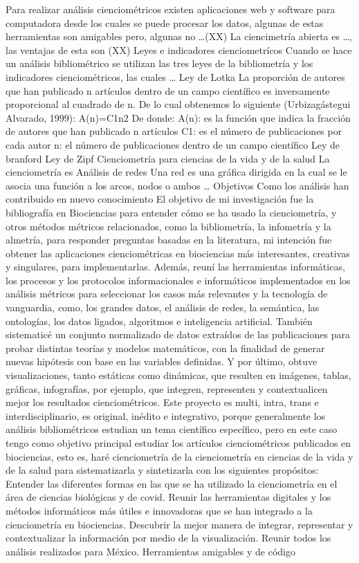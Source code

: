 \documentclass[../Main.tex]{subfiles}
\begin{document}
Para realizar análisis cienciométricos existen aplicaciones web y software para computadora desde los cuales se puede procesar los datos, algunas de estas herramientas son amigables pero, algunas no …(XX)
La ciencimetría abierta es …, las ventajas de esta son (XX)
Leyes e indicadores cienciometrícos 
Cuando se hace un análisis bibliométrico se utilizan las tres leyes de la bibliometría y los indicadores cienciométricos, las cuales … 
Ley de Lotka
La proporción de autores que han publicado n artículos dentro de un campo científico es inversamente proporcional al cuadrado de n. De lo cual obtenemos lo siguiente (Urbizagástegui Alvarado, 1999):
A(n)=C1n2
De donde:
A(n): es la función que indica la fracción de autores que han publicado n artículos
C1: es el número de publicaciones por cada autor 
n: el número de publicaciones dentro de un campo científico 
Ley de branford 
Ley de Zipf
Cienciometría para ciencias de la vida y de la salud
La cienciometría es 
Análisis de redes
Una red es una gráfica dirigida en la cual se le asocia una función a los arcos, nodos o ambos … 
Objetivos
Como los análisis han contribuido en nuevo conocimiento
El objetivo de mi investigación fue la bibliografía en Biociencias para entender cómo se ha usado la cienciometría, y otros métodos métricos relacionados, como la bibliometría, la infometría y la almetría, para responder preguntas basadas en la literatura, mi intención fue obtener las aplicaciones cienciométricas en biociencias más interesantes, creativas y singulares, para implementarlas. Además, reuní las herramientas informáticas, los procesos y los protocolos informacionales e informáticos implementados en los análisis métricos para seleccionar los casos más relevantes y la tecnología de vanguardia, como, los grandes datos, el análisis de redes, la semántica, las ontologías, los datos ligados, algoritmos e inteligencia artificial. También sistematicé un conjunto normalizado de datos extraídos de las publicaciones para probar distintas teorías y modelos matemáticos, con la finalidad de generar nuevas hipótesis con base en las variables definidas. Y por último, obtuve visualizaciones, tanto estáticas como dinámicas, que resulten en imágenes, tablas, gráficas, infografías, por ejemplo, que integren, representen y contextualicen mejor los resultados cienciométricos.
Este proyecto es multi, intra, trans e interdisciplinario, es original, inédito e integrativo, porque generalmente los análisis bibliométricos estudian un tema científico específico, pero en este caso tengo como objetivo principal estudiar los artículos cienciométricos publicados en biociencias, esto es, haré cienciometría de la cienciometría en ciencias de la vida y de la salud para sistematizarla y sintetizarla con los siguientes propósitos: 
Entender las diferentes formas en las que se ha utilizado la cienciometría en el área de ciencias biológicas y de covid.
Reunir las herramientas digitales y los métodos informáticos más útiles e innovadoras que se han integrado a la cienciometría en biociencias.
Descubrir la mejor manera de integrar, representar y contextualizar la información por medio de la visualización.
Reunir todos los análisis realizados para México.
Herramientas amigables y de código 
\end{document}
